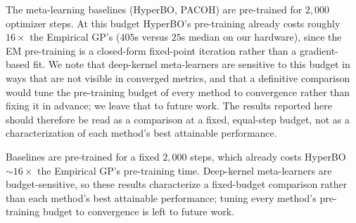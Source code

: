 %
%
%
%


The meta-learning baselines (HyperBO, PACOH) are pre-trained for $2{,}000$ optimizer
steps. At this budget HyperBO's pre-training already costs roughly $16\times$ the
Empirical GP's ($405$s versus $25$s median on our hardware), since the EM pre-training
is a closed-form fixed-point iteration rather than a gradient-based fit. We note that
deep-kernel meta-learners are sensitive to this budget in ways that are not visible in
converged metrics, and that a definitive comparison would tune the pre-training budget
of every method to convergence rather than fixing it in advance; we leave that to future
work. The results reported here should therefore be read as a comparison at a fixed,
equal-step budget, not as a characterization of each method's best attainable
performance.


Baselines are pre-trained for a fixed $2{,}000$ steps, which already costs HyperBO
$\sim\!16\times$ the Empirical GP's pre-training time. Deep-kernel meta-learners are
budget-sensitive, so these results characterize a fixed-budget comparison rather than
each method's best attainable performance; tuning every method's pre-training budget to
convergence is left to future work.

